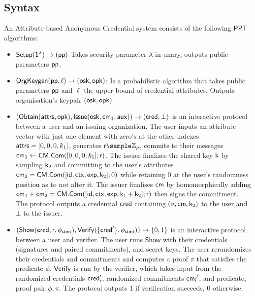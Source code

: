 \subsection{Syntax}
\begin{definition} An Attribute-based Anonymous Credential system consists of the following $\mathsf{PPT}$ algorithms:
    \begin{itemize}
    \item $\mathsf{Setup}(\mathsf{1^{\lambda}}) \to (\mathsf{pp})$ Takes security parameter $\lambda$ in unary, outputs public parameters $\mathsf{pp}$.
    
    \item $\mathsf{OrgKeygen}(\mathsf{pp}, \ell) \to (\mathsf{osk}, \mathsf{opk})$: Is a probabilistic algorithm that takes public parameters $\mathsf{pp}$ and $\ell$ the upper bound of credential attributes. Outputs organisation's keypair $(\mathsf{osk}, \mathsf{opk})$
       
    \item $(\mathsf{Obtain}(\mathsf{attrs}, \mathsf{opk}), \mathsf{Issue}(\mathsf{osk}, \mathsf{cm}_1, \mathsf{aux})) \rightarrow (\mathsf{cred}, \bot)$ is an interactive protocol between a user and an issuing organization. The user inputs an attribute vector with just one element with zero's at the other indexes $\mathsf{attrs} = [0,0,0, k_1]$, generates $\usk \sample \Z_p$, commits to their messages $\mathsf{cm}_1 \gets \mathsf{CM.Com}([0,0,0, k_1]; \mathsf{r})$. The issuer finalizes the shared key $\mathsf{k}$ by sampling $\mathsf{k}_2$ and committing to the user's attributes $\mathsf{cm}_2 = \mathsf{CM.Com}([\mathsf{id},\mathsf{ctx},\mathsf{exp}, \mathsf{k}_2]; 0)$ while retaining $0$ at the user's randomness position as to not alter it. The issuer finalises $\mathsf{cm}$ by homomorphically adding $\mathsf{cm}_1 + \mathsf{cm}_2 = \mathsf{CM.Com}([\mathsf{id},\mathsf{ctx},\mathsf{exp}, \mathsf{k}_1+\mathsf{k}_2]; \mathsf{r})$ then signs the commitment. The protocol outputs a credential $\mathsf{cred}$ containing $(\sigma, \mathsf{cm}, \mathsf{k}_2)$ to the user and $\bot$ to the issuer.    
    
    \item $(\mathsf{Show}(\mathsf{cred}, \mathsf{r}, \phi_{\mathsf{stmt}}), \mathsf{Verify}(\{\mathsf{cred}'\}, \phi_{\mathsf{stmt}})) \rightarrow \{0,1\}$ is an interactive protocol between a user and verifier. The user runs $\mathsf{Show}$ with their credentials (signatures and paired commitments), and secret keys. The user rerandomizes their credentials and commitments and computes a proof $\pi$ that satisfies the predicate $\phi$.
    $\mathsf{Verify}$ is run by the verifier, which takes input from the randomized credentials $\mathsf{cred}_i'$, randomized commitments $\mathsf{cm_i}'$, and predicate, proof pair $\phi, \pi$. The protocol outputs 1 if verification succeeds, 0 otherwise.
    \end{itemize}
\end{definition}


